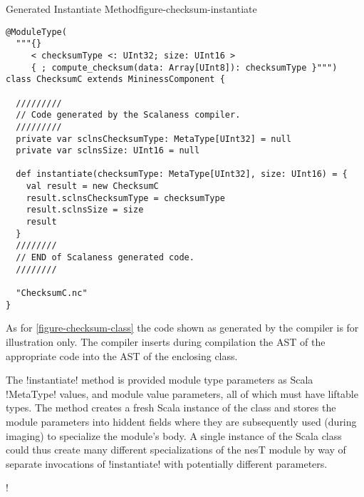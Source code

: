 \singlespace
\begin{fpfig}[tbhp]{Generated Instantiate Method}{figure-checksum-instantiate}
{
\begin{lstlisting}[language=scalaness]
@ModuleType(
  """{}
     < checksumType <: UInt32; size: UInt16 >
     { ; compute_checksum(data: Array[UInt8]): checksumType }""")
class ChecksumC extends MininessComponent {

  /////////
  // Code generated by the Scalaness compiler.
  /////////
  private var sclnsChecksumType: MetaType[UInt32] = null
  private var sclnsSize: UInt16 = null

  def instantiate(checksumType: MetaType[UInt32], size: UInt16) = {
    val result = new ChecksumC
    result.sclnsChecksumType = checksumType
    result.sclnsSize = size
    result
  }
  ////////
  // END of Scalaness generated code.
  //////// 
           
  "ChecksumC.nc"
}
\end{lstlisting}
}
\end{fpfig}
\primaryspacing

As for \autoref{figure-checksum-class} the code shown as generated by the compiler is for
illustration only. The compiler inserts during compilation the AST of the appropriate code into
the AST of the enclosing class.

The !instantiate! method is provided module type parameters as Scala !MetaType! values, and
module value parameters, all of which must have liftable types. The method creates a fresh Scala
instance of the class and stores the module parameters into hiddent fields where they are
subsequently used (during imaging) to specialize the module's body. A single instance of the
Scala class could thus create many different specializations of the nesT module by way of
separate invocations of !instantiate! with potentially different parameters.

\lstDeleteShortInline!

